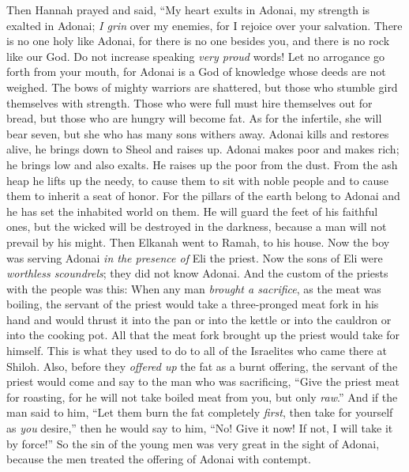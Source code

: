 \begin{biblechapter} %
\verse Then Hannah prayed and said,
\verse “My heart exults in Adonai, my strength is exalted in Adonai; \textit{I grin} over my enemies, for I rejoice over your salvation.
\verse There is no one holy like Adonai, for there is no one besides you, 
and there is no rock like our God.
\verse Do not increase speaking \textit{very proud} words! 
Let no arrogance go forth from your mouth, 
for Adonai is a God of knowledge 
whose deeds are not weighed.
\verse The bows of mighty warriors are shattered, 
but those who stumble gird themselves with strength.
\verse Those who were full must hire themselves out for bread, 
but those who are hungry will become fat. 
As for the infertile, she will bear seven, 
but she who has many sons withers away.
\verse Adonai kills and restores alive, 
he brings down to Sheol and raises up.
\verse Adonai makes poor and makes rich; 
he brings low and also exalts.
\verse He raises up the poor from the dust. 
From the ash heap he lifts up the needy, 
to cause them to sit with noble people 
and to cause them to inherit a seat of honor. 
For the pillars of the earth belong to Adonai 
and he has set the inhabited world on them.
\verse He will guard the feet of his faithful ones, 
but the wicked will be destroyed in the darkness, 
because a man will not prevail by his might.
\verse Then Elkanah went to Ramah, to his house. Now the boy was serving Adonai \textit{in the presence of} Eli the priest.
 Now the sons of Eli were \textit{worthless scoundrels}; they did not know Adonai.
\verse And the custom of the priests with the people was this: When any man \textit{brought a sacrifice}, as the meat was boiling, the servant of the priest would take a three-pronged meat fork in his hand
\verse and would thrust it into the pan or into the kettle or into the cauldron or into the cooking pot. All that the meat fork brought up the priest would take for himself. This is what they used to do to all of the Israelites who came there at Shiloh.
\verse Also, before they \textit{offered up} the fat as a burnt offering, the servant of the priest would come and say to the man who was sacrificing, “Give the priest meat for roasting, for he will not take boiled meat from you, but only \textit{raw}.”
\verse And if the man said to him, “Let them burn the fat completely \textit{first}, then take for yourself as \textit{you} desire,” then he would say to him, “No! Give it now! If not, I will take it by force!”
\verse So the sin of the young men was very great in the sight of Adonai, because the men treated the offering of Adonai with contempt.

\end{biblechapter}
